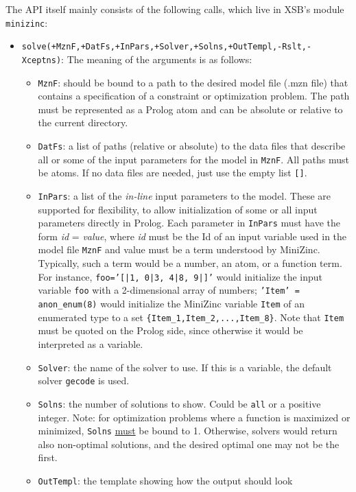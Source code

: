 The API itself mainly consists of the following calls, which live in XSB's
module \texttt{minizinc}: 
\begin{itemize}
\item
  \texttt{solve(+MznF,+DatFs,+InPars,+Solver,+Solns,+OutTempl,-Rslt,-Xceptns)}: 
  The meaning of the arguments is as follows:
  \begin{itemize}
  \item    \texttt{MznF}: should be bound to a path to the desired 
    model file (.mzn file) that contains a specification of a constraint or
    optimization problem. The path must be represented as a Prolog atom and
    can be absolute or relative to the current directory.
  \item \texttt{DatFs}: a list of paths (relative or absolute)  
    to the data files that describe all or some of the input parameters for
    the model in \texttt{MznF}. All paths must be atoms.
    If no data files are needed, just use the empty list \texttt{[]}. 
  \item \texttt{InPars}: a list of the \emph{in-line} input parameters to
    the model.
    These are supported for flexibility, to allow initialization of some or
    all input parameters directly in Prolog.
    Each parameter in \texttt{InPars} must have the form \emph{id} =
    \emph{value}, where \emph{id} must be the Id of an input variable used in
    the model file \texttt{MznF} and value must be a term understood by MiniZinc.
    Typically, such a term would be a number, an atom, or a function term.
    For instance,  \texttt{foo='[|1, 0|3, 4|8, 9|]'} would initialize the input
    variable \texttt{foo} with a 2-dimensional array of numbers;
    \texttt{'Item' = anon\_enum(8)}  would initialize the MiniZinc variable
    \texttt{Item}  of an enumerated type to a set
    \texttt{\{Item\_1,Item\_2,...,Item\_8\}}.  Note that \texttt{Item} must
    be quoted on the Prolog side, since otherwise it would be interpreted
    as a variable.
  \item \texttt{Solver}: the name of the solver to use. If this is a variable,
    the default solver \texttt{gecode} is used. 
  \item \texttt{Solns}: the number of solutions to show. 
    Could be \texttt{all} or a positive integer.
    Note: for optimization problems where a function is maximized or minimized,
    \texttt{Solns} \underline{must} be bound to 1. Otherwise, solvers would
    return also non-optimal solutions, and the desired optimal one may not
    be the first.
  \item \texttt{OutTempl}: the template showing how the output should look

\end{itemize}
\end{itemize}
